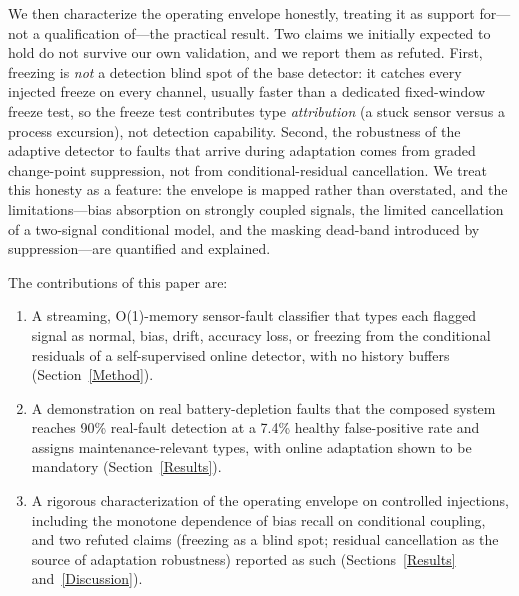 We then characterize the operating envelope honestly, treating it as support for---not a qualification of---the practical result. Two claims we initially expected to hold do not survive our own validation, and we report them as refuted. First, freezing is \emph{not} a detection blind spot of the base detector: it catches every injected freeze on every channel, usually faster than a dedicated fixed-window freeze test, so the freeze test contributes type \emph{attribution} (a stuck sensor versus a process excursion), not detection capability. Second, the robustness of the adaptive detector to faults that arrive during adaptation comes from graded change-point suppression, not from conditional-residual cancellation. We treat this honesty as a feature: the envelope is mapped rather than overstated, and the limitations---bias absorption on strongly coupled signals, the limited cancellation of a two-signal conditional model, and the masking dead-band introduced by suppression---are quantified and explained.

The contributions of this paper are:
\begin{enumerate}
    \item A streaming, O(1)-memory sensor-fault classifier that types each flagged signal as normal, bias, drift, accuracy loss, or freezing from the conditional residuals of a self-supervised online detector, with no history buffers (Section~\ref{Method}).
    \item A demonstration on real battery-depletion faults that the composed system reaches 90\% real-fault detection at a 7.4\% healthy false-positive rate and assigns maintenance-relevant types, with online adaptation shown to be mandatory (Section~\ref{Results}).
    \item A rigorous characterization of the operating envelope on controlled injections, including the monotone dependence of bias recall on conditional coupling, and two refuted claims (freezing as a blind spot; residual cancellation as the source of adaptation robustness) reported as such (Sections~\ref{Results} and~\ref{Discussion}).
\end{enumerate}
